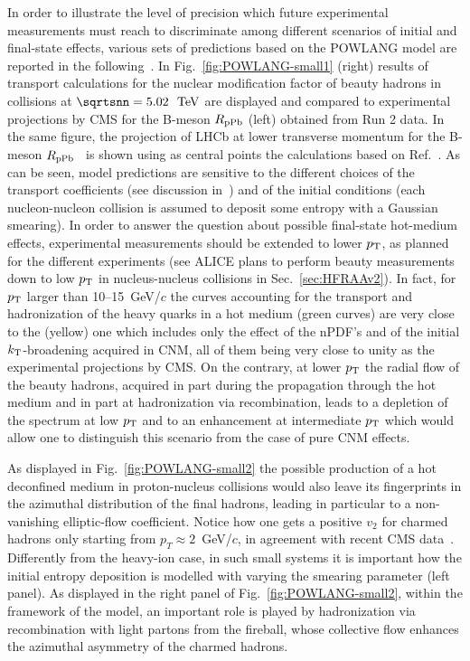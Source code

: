 In order to illustrate the level of precision which future experimental measurements must reach to discriminate among different scenarios of initial and final-state effects, various sets of predictions based on the POWLANG model are reported in the following~\cite{Beraudo:2015wsd}.
In Fig.~\ref{fig:POWLANG-small1} (right) results of transport calculations for the nuclear modification factor of beauty hadrons in \pPb collisions at $\sqrtsnn=5.02~\UTeV$  are displayed and compared to experimental projections by CMS for the B-meson $R_{\rm pPb}$ (left) obtained from Run 2 data. In the same figure, the projection of LHCb at lower transverse momentum for the  B-meson $R_{\rm pPb}$~\cite{LHCb-CONF-2018-005}  is shown using as central points the calculations based on Ref.~\cite{Kusina:2017gkz}. As can be seen, model predictions are sensitive to the different choices of the transport coefficients (see discussion in~\cite{Beraudo:2015wsd}) and of the initial conditions (each nucleon-nucleon collision is assumed to deposit some entropy with a Gaussian smearing). In order to answer the question about possible final-state hot-medium effects, experimental measurements should be extended to lower $p\sb{\scriptstyle\mathrm{T}}$, as planned for the different experiments (see ALICE plans to perform beauty measurements down to low $p\sb{\scriptstyle\mathrm{T}}$ in nucleus-nucleus collisions in Sec.~\ref{sec:HFRAAv2}). In fact, for $p\sb{\scriptstyle\mathrm{T}}$ larger than 10--15~GeV/$c$ the curves accounting for the transport and hadronization of the heavy quarks in a hot medium (green curves) are very close to the (yellow) one which includes only the effect of the nPDF's and of the initial $k_{\rm T}$-broadening acquired in CNM, all of them being very close to unity as the experimental projections by CMS. On the contrary, at lower $p\sb{\scriptstyle\mathrm{T}}$ the radial flow of the beauty hadrons, acquired in part during the propagation through the hot medium and in part at hadronization via recombination, leads to a depletion of the spectrum at low $p\sb{\scriptstyle\mathrm{T}}$ and to an enhancement at intermediate $p\sb{\scriptstyle\mathrm{T}}$ which would allow one to distinguish this scenario from the case of pure CNM effects. 

As displayed in Fig.~\ref{fig:POWLANG-small2} the possible production of a hot deconfined medium in proton-nucleus collisions would also leave its fingerprints in the azimuthal distribution of the final hadrons, leading in particular to a non-vanishing elliptic-flow coefficient. Notice how one gets a positive $v_2$ for charmed hadrons only starting from $p_T\!\approx\!2$~GeV/$c$, in agreement with recent CMS data~\cite{Sirunyan:2018toe}. Differently from the heavy-ion case, in such small systems it is important how the initial entropy deposition is modelled with varying the smearing parameter (left panel). As displayed in the right panel of Fig.~\ref{fig:POWLANG-small2}, within the framework of the model, an important role is played by hadronization via recombination with light partons from the fireball, whose collective flow enhances the azimuthal asymmetry of the charmed hadrons.

